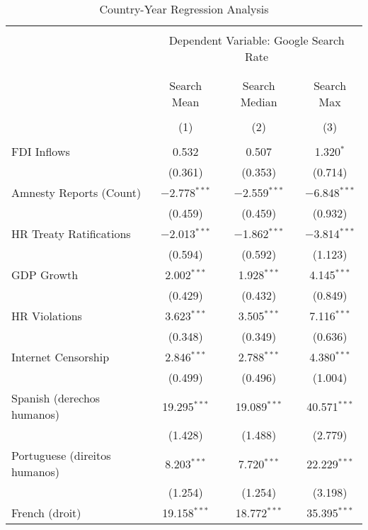 
\begin{table}[!htbp] \centering 
  \caption{Country-Year Regression Analysis} 
  \label{} 
\begin{tabular}{@{\extracolsep{5pt}}lccc} 
\\[-1.8ex]\hline 
\hline \\[-1.8ex] 
 & \multicolumn{3}{c}{Dependent Variable: Google Search Rate} \\ 
\cline{2-4} 
\\[-1.8ex] & \multicolumn{3}{c}{ } \\ 
 & Search Mean & Search Median & Search Max \\ 
\\[-1.8ex] & (1) & (2) & (3)\\ 
\hline \\[-1.8ex] 
 FDI Inflows & 0.532 & 0.507 & 1.320$^{*}$ \\ 
  & (0.361) & (0.353) & (0.714) \\ 
  Amnesty Reports (Count) & $-$2.778$^{***}$ & $-$2.559$^{***}$ & $-$6.848$^{***}$ \\ 
  & (0.459) & (0.459) & (0.932) \\ 
  HR Treaty Ratifications & $-$2.013$^{***}$ & $-$1.862$^{***}$ & $-$3.814$^{***}$ \\ 
  & (0.594) & (0.592) & (1.123) \\ 
  GDP Growth & 2.002$^{***}$ & 1.928$^{***}$ & 4.145$^{***}$ \\ 
  & (0.429) & (0.432) & (0.849) \\ 
  HR Violations & 3.623$^{***}$ & 3.505$^{***}$ & 7.116$^{***}$ \\ 
  & (0.348) & (0.349) & (0.636) \\ 
  Internet Censorship & 2.846$^{***}$ & 2.788$^{***}$ & 4.380$^{***}$ \\ 
  & (0.499) & (0.496) & (1.004) \\ 
  Spanish (derechos humanos) & 19.295$^{***}$ & 19.089$^{***}$ & 40.571$^{***}$ \\ 
  & (1.428) & (1.488) & (2.779) \\ 
  Portuguese (direitos humanos) & 8.203$^{***}$ & 7.720$^{***}$ & 22.229$^{***}$ \\ 
  & (1.254) & (1.254) & (3.198) \\ 
  French (droit) & 19.158$^{***}$ & 18.772$^{***}$ & 35.395$^{***}$ \\ 

\end{tabular}
\end{table}
